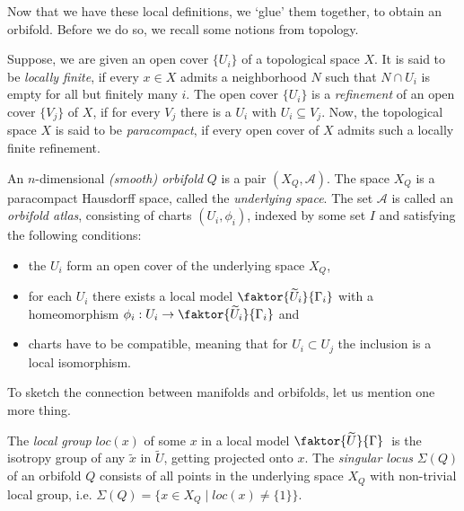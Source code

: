 Now that we have these local definitions, we `glue' them together, to obtain an orbifold.
Before we do so, we recall some notions from topology.

Suppose, we are given an open cover \(\{U_i\}\) of a topological space \(X\).
It is said to be \emph{locally finite}, if every \(x \in X\) admits a neighborhood \(N\) such that \(N \cap U_i\) is empty for all but finitely many \(i\).
The open cover \(\{U_i\}\) is a \emph{refinement} of an open cover \(\{V_j\}\) of \(X\), if for every \(V_j\) there is a \(U_i\) with \(U_i \subseteq V_j\).
Now, the topological space \(X\) is said to be \emph{paracompact}, if every open cover of \(X\) admits such a locally finite refinement.

\begin{definition}
    An \(n\)-dimensional \emph{(smooth) orbifold} \(Q\) is a pair \((X_Q, \mathcal{A})\).
    The space \(X_Q\) is a paracompact Hausdorff space, called the \emph{underlying space}.
    The set \(\mathcal{A}\) is called an \emph{orbifold atlas}, consisting of charts \((U_i, \phi_i)\), indexed by some set \(I\) and satisfying the following conditions:
    \begin{itemize}
        \item the \(U_i\) form an open cover of the underlying space \(X_Q\),\vspace*{-.7em}
        \item for each \(U_i\) there exists a local model \(\faktor{\widetilde{U}_i}{\Gamma_i}\) with a homeomorphism \(\phi_i : U_i \to \faktor{\widetilde{U}_i}{\Gamma_i}\) and
        \item charts have to be compatible, meaning that for \(U_i \subset U_j\) the inclusion is a local isomorphism.
    \end{itemize}
\end{definition}

To sketch the connection between manifolds and orbifolds, let us mention one more thing.

\begin{definition}
    The \emph{local group} \(loc(x)\) of some \(x\) in a local model \(\faktor{\widetilde{U}}{\Gamma}\;\) is the isotropy group of any \(\widetilde{x}\) in \(\widetilde{U}\), getting projected onto \(x\).
    The \emph{singular locus} \(\Sigma (Q)\) of an orbifold \(Q\) consists of all points in the underlying space \(X_Q\) with non-trivial local group, i.e. \(\Sigma(Q) = \{x \in X_Q \;\vert\; loc(x) \neq \{1\}\}\).
\end{definition}

